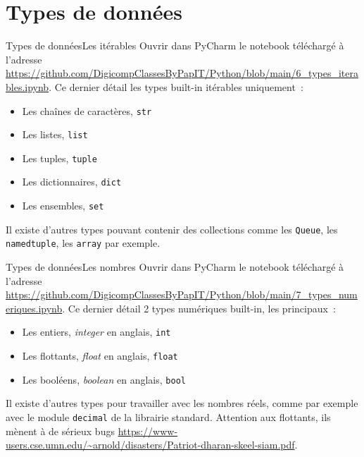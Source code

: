 \documentclass{beamer}
\begin{document}
    \section{Types de données}\label{sec:data-types}

    \begin{frame}{Types de données}{Les itérables}
        Ouvrir dans PyCharm le notebook téléchargé à l'adresse \url{https://github.com/DigicompClassesByPapIT/Python/blob/main/6_types_iterables.ipynb}.
        \bigbreak
        Ce dernier détail les types built-in itérables uniquement~:
        \begin{itemize}
            \item Les chaînes de caractères, \lstinline{str}
            \item Les listes, \lstinline{list}
            \item Les tuples, \lstinline{tuple}
            \item Les dictionnaires, \lstinline{dict}
            \item Les ensembles, \lstinline{set}
        \end{itemize}
        Il existe d'autres types pouvant contenir des collections comme les \lstinline{Queue}, les \lstinline{namedtuple}, les \lstinline{array} par exemple.
    \end{frame}

    \begin{frame}{Types de données}{Les nombres}
        Ouvrir dans PyCharm le notebook téléchargé à l'adresse \url{https://github.com/DigicompClassesByPapIT/Python/blob/main/7_types_numeriques.ipynb}.
        \bigbreak
        Ce dernier détail 2 types numériques built-in, les principaux~:
        \begin{itemize}
            \item Les entiers, \textit{integer} en anglais, \lstinline{int}
            \item Les flottants, \textit{float} en anglais, \lstinline{float}
            \item Les booléens, \textit{boolean} en anglais, \lstinline{bool}
        \end{itemize}
        Il existe d'autres types pour travailler avec les nombres réels, comme par exemple avec le module \lstinline{decimal} de la librairie standard.
        Attention aux flottants, ils mènent à de sérieux bugs \url{https://www-users.cse.umn.edu/~arnold/disasters/Patriot-dharan-skeel-siam.pdf}.
    \end{frame}
\end{document}
